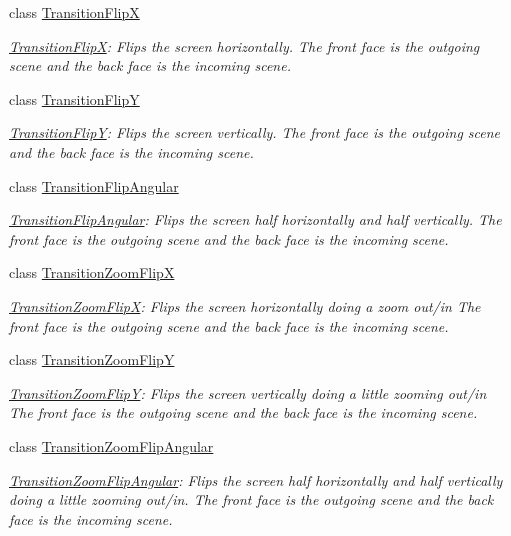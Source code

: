 \begin{DoxyCompactItemize}
class \hyperlink{classTransitionFlipX}{Transition\+FlipX}
\begin{DoxyCompactList}\small\item\em \hyperlink{classTransitionFlipX}{Transition\+FlipX}\+: Flips the screen horizontally. The front face is the outgoing scene and the back face is the incoming scene. \end{DoxyCompactList}\item 
class \hyperlink{classTransitionFlipY}{Transition\+FlipY}
\begin{DoxyCompactList}\small\item\em \hyperlink{classTransitionFlipY}{Transition\+FlipY}\+: Flips the screen vertically. The front face is the outgoing scene and the back face is the incoming scene. \end{DoxyCompactList}\item 
class \hyperlink{classTransitionFlipAngular}{Transition\+Flip\+Angular}
\begin{DoxyCompactList}\small\item\em \hyperlink{classTransitionFlipAngular}{Transition\+Flip\+Angular}\+: Flips the screen half horizontally and half vertically. The front face is the outgoing scene and the back face is the incoming scene. \end{DoxyCompactList}\item 
class \hyperlink{classTransitionZoomFlipX}{Transition\+Zoom\+FlipX}
\begin{DoxyCompactList}\small\item\em \hyperlink{classTransitionZoomFlipX}{Transition\+Zoom\+FlipX}\+: Flips the screen horizontally doing a zoom out/in The front face is the outgoing scene and the back face is the incoming scene. \end{DoxyCompactList}\item 
class \hyperlink{classTransitionZoomFlipY}{Transition\+Zoom\+FlipY}
\begin{DoxyCompactList}\small\item\em \hyperlink{classTransitionZoomFlipY}{Transition\+Zoom\+FlipY}\+: Flips the screen vertically doing a little zooming out/in The front face is the outgoing scene and the back face is the incoming scene. \end{DoxyCompactList}\item 
class \hyperlink{classTransitionZoomFlipAngular}{Transition\+Zoom\+Flip\+Angular}
\begin{DoxyCompactList}\small\item\em \hyperlink{classTransitionZoomFlipAngular}{Transition\+Zoom\+Flip\+Angular}\+: Flips the screen half horizontally and half vertically doing a little zooming out/in. The front face is the outgoing scene and the back face is the incoming scene. \end{DoxyCompactList}\item 

\end{DoxyCompactItemize}
